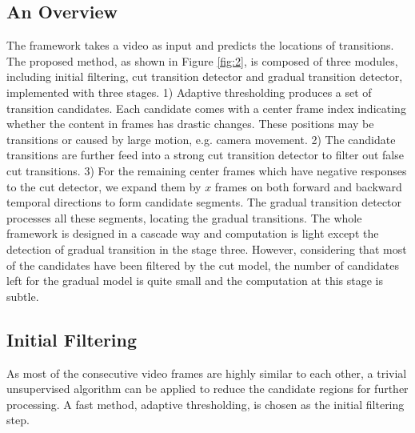 \documentclass[runningheads]{llncs}
\begin{document}
\subsection{An Overview}
The framework takes a video as input and predicts the locations of transitions. The proposed method, as shown in Figure \ref{fig:2}, is composed of three modules, including initial filtering, cut transition detector and gradual transition detector, implemented with three stages. 1) Adaptive thresholding produces a set of transition candidates. Each candidate comes with a center frame index indicating whether the content in frames has drastic changes. These positions may be transitions or caused by large motion, e.g. camera movement. 2) The candidate transitions are further feed into a strong cut transition detector to filter out false cut transitions. 3) For the remaining center frames which have negative responses to the cut detector, we expand them by \(x\) frames on both forward and backward temporal directions to form candidate segments. The gradual transition detector processes all these segments, locating the gradual transitions. The whole framework is designed in a cascade way and computation is light except the detection of gradual transition in the stage three. However, considering that most of the candidates have been filtered by the cut model, the number of candidates left for the gradual model is quite small and the computation at this stage is subtle.

\subsection{Initial Filtering}
As most of the consecutive video frames are highly similar to each other, a trivial unsupervised algorithm can be applied to reduce the candidate regions for further processing. A fast method, adaptive thresholding, is chosen as the initial filtering step. 
\end{document}
